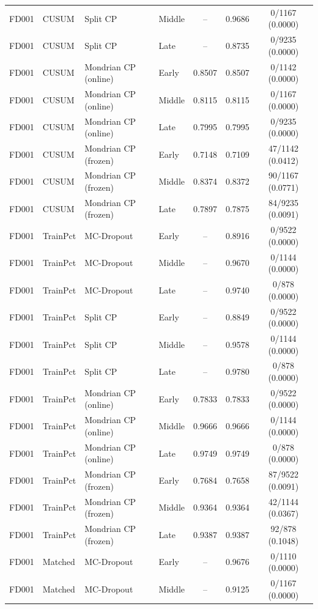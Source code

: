 \begin{table}[t]
\begin{tabular}{llllccc}
FD001 & CUSUM & Split CP & Middle & -- & 0.9686 & 0/1167 (0.0000) \\
FD001 & CUSUM & Split CP & Late & -- & 0.8735 & 0/9235 (0.0000) \\
FD001 & CUSUM & Mondrian CP (online) & Early & 0.8507 & 0.8507 & 0/1142 (0.0000) \\
FD001 & CUSUM & Mondrian CP (online) & Middle & 0.8115 & 0.8115 & 0/1167 (0.0000) \\
FD001 & CUSUM & Mondrian CP (online) & Late & 0.7995 & 0.7995 & 0/9235 (0.0000) \\
FD001 & CUSUM & Mondrian CP (frozen) & Early & 0.7148 & 0.7109 & 47/1142 (0.0412) \\
FD001 & CUSUM & Mondrian CP (frozen) & Middle & 0.8374 & 0.8372 & 90/1167 (0.0771) \\
FD001 & CUSUM & Mondrian CP (frozen) & Late & 0.7897 & 0.7875 & 84/9235 (0.0091) \\
FD001 & TrainPct & MC-Dropout & Early & -- & 0.8916 & 0/9522 (0.0000) \\
FD001 & TrainPct & MC-Dropout & Middle & -- & 0.9670 & 0/1144 (0.0000) \\
FD001 & TrainPct & MC-Dropout & Late & -- & 0.9740 & 0/878 (0.0000) \\
FD001 & TrainPct & Split CP & Early & -- & 0.8849 & 0/9522 (0.0000) \\
FD001 & TrainPct & Split CP & Middle & -- & 0.9578 & 0/1144 (0.0000) \\
FD001 & TrainPct & Split CP & Late & -- & 0.9780 & 0/878 (0.0000) \\
FD001 & TrainPct & Mondrian CP (online) & Early & 0.7833 & 0.7833 & 0/9522 (0.0000) \\
FD001 & TrainPct & Mondrian CP (online) & Middle & 0.9666 & 0.9666 & 0/1144 (0.0000) \\
FD001 & TrainPct & Mondrian CP (online) & Late & 0.9749 & 0.9749 & 0/878 (0.0000) \\
FD001 & TrainPct & Mondrian CP (frozen) & Early & 0.7684 & 0.7658 & 87/9522 (0.0091) \\
FD001 & TrainPct & Mondrian CP (frozen) & Middle & 0.9364 & 0.9364 & 42/1144 (0.0367) \\
FD001 & TrainPct & Mondrian CP (frozen) & Late & 0.9387 & 0.9387 & 92/878 (0.1048) \\
FD001 & Matched & MC-Dropout & Early & -- & 0.9676 & 0/1110 (0.0000) \\
FD001 & Matched & MC-Dropout & Middle & -- & 0.9125 & 0/1167 (0.0000) \\

\end{tabular}
\end{table}
